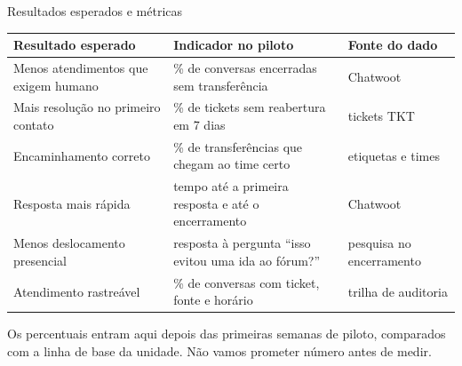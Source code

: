 \documentclass[aspectratio=169,10pt]{beamer}
\begin{document}
\begin{frame}{Resultados esperados e métricas}
  \footnotesize
  \renewcommand{\arraystretch}{1.2}
  \begin{tabularx}{\linewidth}{@{}>{\raggedright\arraybackslash}p{4.3cm} X >{\raggedright\arraybackslash}p{2.6cm}@{}}
    \toprule
    \textbf{Resultado esperado} & \textbf{Indicador no piloto} & \textbf{Fonte do dado} \\
    \midrule
    Menos atendimentos que exigem humano & \% de conversas encerradas sem transferência & Chatwoot \\
    Mais resolução no primeiro contato & \% de tickets sem reabertura em 7 dias & tickets TKT \\
    Encaminhamento correto & \% de transferências que chegam ao time certo & etiquetas e times \\
    Resposta mais rápida & tempo até a primeira resposta e até o encerramento & Chatwoot \\
    Menos deslocamento presencial & resposta à pergunta ``isso evitou uma ida ao fórum?'' & pesquisa no encerramento \\
    Atendimento rastreável & \% de conversas com ticket, fonte e horário & trilha de auditoria \\
    \bottomrule
  \end{tabularx}
  \vfill
  {\small Os percentuais entram aqui depois das primeiras semanas de piloto, comparados com a linha de base da unidade. Não vamos prometer número antes de medir.}
\end{frame}
\end{document}
